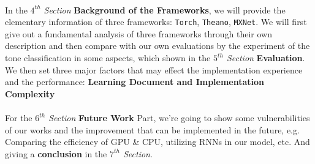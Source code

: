 \documentclass[12pt]{article}
\begin{document}
\\
In the {\it $4^{th}$ Section} {\bf Background of the Frameworks}, we will provide the elementary information of three frameworks: \texttt{Torch}, \texttt{Theano}, \texttt{MXNet}. We will first give out a fundamental analysis of three frameworks through their own description and then compare with our own evaluations by the experiment of the tone classification in some aspects, which shown in the {\it $5^{th}$ Section} {\bf Evaluation}. We then set three major factors that may effect the implementation experience and the performance: {\bf Learning Document and Implementation Complexity}\\
\\
For the {\it $6^{th}$ Section} {\bf Future Work} Part, we're going to show some vulnerabilities of our works and the improvement that can be implemented in the future, e.g. Comparing the efficiency of GPU \& CPU, utilizing RNNs in our model, etc. And giving a {\bf conclusion} in the {\it $7^{th}$ Section}.
\\
\end{document}
